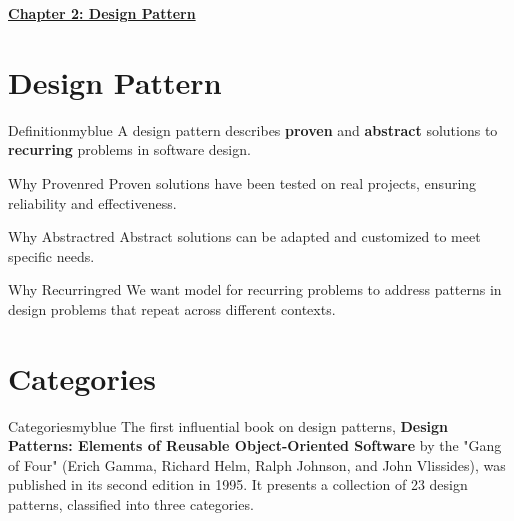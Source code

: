 \newpage
\begin{center}
    \Huge{\textbf{\underline{Chapter 2: Design Pattern}}}
\end{center}

\setcounter{section}{0}

\vspace{0.35cm}

\section{Design Pattern}

\begin{prettyBox}{Definition}{myblue}
A design pattern describes \textbf{proven} and \textbf{abstract} solutions  
to \textbf{recurring} problems in software design.
\end{prettyBox}


\vspace{0.35cm}
\begin{prettyBox}{Why Proven}{red}
Proven solutions have been tested on real projects, ensuring reliability and effectiveness.
\end{prettyBox}

\vspace{0.35cm}
\begin{prettyBox}{Why Abstract}{red}
Abstract solutions can be adapted and customized to meet specific needs.
\end{prettyBox}

\vspace{0.35cm}
\begin{prettyBox}{Why Recurring}{red}
We want model for recurring problems to address patterns in design problems that repeat across different contexts.
\end{prettyBox}


\vspace{0.5cm}
\section{Categories}
\begin{prettyBox}{Categories}{myblue}
The first influential book on design patterns, \textbf{Design Patterns: Elements of Reusable
Object-Oriented Software} by the "Gang of Four" (Erich Gamma, Richard Helm,
Ralph Johnson, and John Vlissides), was published in its second edition in 1995.
It presents a collection of 23 design patterns, classified into three categories.
\end{prettyBox}

